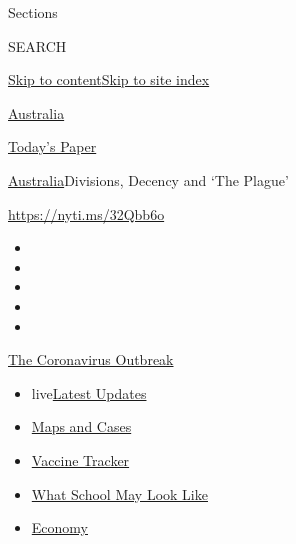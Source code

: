 Sections

SEARCH

\protect\hyperlink{site-content}{Skip to
content}\protect\hyperlink{site-index}{Skip to site index}

\href{https://www.nytimes3xbfgragh.onion/section/world/australia}{Australia}

\href{https://myaccount.nytimes3xbfgragh.onion/auth/login?response_type=cookie\&client_id=vi}{}

\href{https://www.nytimes3xbfgragh.onion/section/todayspaper}{Today's
Paper}

\href{/section/world/australia}{Australia}\textbar{}Divisions, Decency
and `The Plague'

\url{https://nyti.ms/32Qbb6o}

\begin{itemize}
\item
\item
\item
\item
\item
\end{itemize}

\href{https://www.nytimes3xbfgragh.onion/news-event/coronavirus?action=click\&pgtype=Article\&state=default\&region=TOP_BANNER\&context=storylines_menu}{The
Coronavirus Outbreak}

\begin{itemize}
\tightlist
\item
  live\href{https://www.nytimes3xbfgragh.onion/2020/08/01/world/coronavirus-covid-19.html?action=click\&pgtype=Article\&state=default\&region=TOP_BANNER\&context=storylines_menu}{Latest
  Updates}
\item
  \href{https://www.nytimes3xbfgragh.onion/interactive/2020/us/coronavirus-us-cases.html?action=click\&pgtype=Article\&state=default\&region=TOP_BANNER\&context=storylines_menu}{Maps
  and Cases}
\item
  \href{https://www.nytimes3xbfgragh.onion/interactive/2020/science/coronavirus-vaccine-tracker.html?action=click\&pgtype=Article\&state=default\&region=TOP_BANNER\&context=storylines_menu}{Vaccine
  Tracker}
\item
  \href{https://www.nytimes3xbfgragh.onion/interactive/2020/07/29/us/schools-reopening-coronavirus.html?action=click\&pgtype=Article\&state=default\&region=TOP_BANNER\&context=storylines_menu}{What
  School May Look Like}
\item
  \href{https://www.nytimes3xbfgragh.onion/live/2020/07/31/business/stock-market-today-coronavirus?action=click\&pgtype=Article\&state=default\&region=TOP_BANNER\&context=storylines_menu}{Economy}
\end{itemize}

